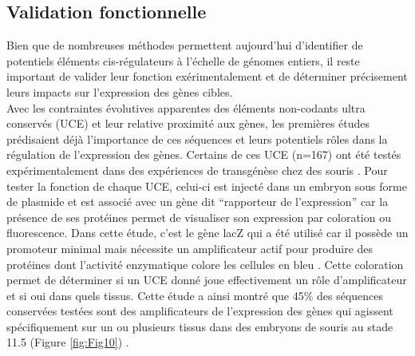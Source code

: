 \subsection{Validation fonctionnelle}
\label{subsec:validation}

Bien que de nombreuses méthodes permettent aujourd’hui d’identifier de potentiels éléments \gls{cis}-régulateurs à l’échelle de génomes entiers, il reste important de valider leur fonction exérimentalement et de déterminer précisement leurs impacts sur l’expression des gènes cibles. \\

Avec les contraintes évolutives apparentes des éléments non-codants ultra conservés (UCE) et leur relative proximité aux gènes, les premières études prédisaient déjà l’importance de ces séquences et leurs potentiels rôles dans la régulation de l’expression des gènes. Certains de ces UCE (n=167) ont été testés expérimentalement dans des expériences de transgénèse chez des souris \citep{pennacchio_vivo_2006}. Pour tester la fonction de chaque UCE, celui-ci est injecté dans un embryon sous forme de plasmide et est associé avec un gène dit “rapporteur de l’expression” car la présence de ses protéines permet de visualiser son expression par coloration ou fluorescence. Dans cette étude, c’est le gène lacZ qui a été utilisé car il possède un promoteur minimal mais nécessite un \gls{amplificateur} actif pour produire des protéines dont l’activité enzymatique colore les cellules en bleu \citep{li_overview_2018}. Cette coloration permet de déterminer si un UCE donné joue effectivement un rôle d’\gls{amplificateur} et si oui dans quels tissus. Cette étude a ainsi montré que 45\% des séquences conservées testées sont des \glspl{amplificateur} de l’expression des gènes qui agissent spécifiquement sur un ou plusieurs tissus dans des embryons de souris au stade 11.5 (Figure \ref{fig:Fig10}) \citep{pennacchio_vivo_2006}. 



